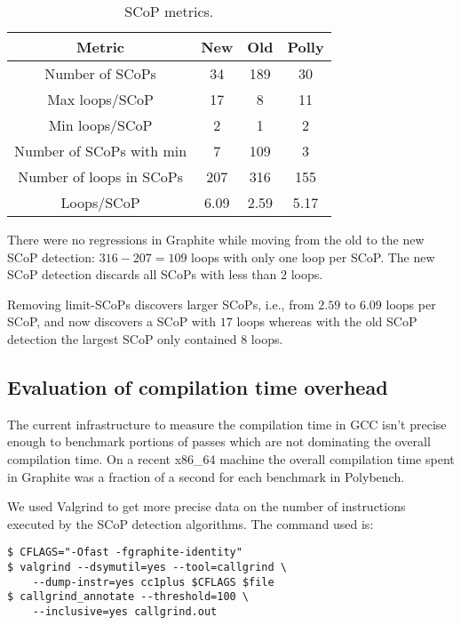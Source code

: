 \documentclass{sig-alternate}
\begin{document}
\begin{table}[h!]
  \begin{center}
    \begin{tabular}{|c|c|c|c|}
      \hline
      Metric                   & New  & Old  & Polly  \\
      \hline
      Number of SCoPs          & 34   & 189  & 30     \\
      Max loops/SCoP           & 17   & 8    & 11     \\
      Min loops/SCoP           & 2    & 1    & 2      \\
      Number of SCoPs with min & 7    & 109  & 3      \\
      Number of loops in SCoPs & 207  & 316  & 155    \\
      Loops/SCoP               & 6.09 & 2.59 & 5.17   \\
      \hline
    \end{tabular}
  \end{center}
  \caption{SCoP metrics.}
  \label{tab:scop-metrics}
\end{table}

There were no regressions in Graphite while moving from the old to the new SCoP
detection: $316 - 207 = 109$ loops with only one loop per SCoP.  The new SCoP
detection discards all SCoPs with less than $2$ loops.

Removing limit-SCoPs discovers larger SCoPs, i.e., from $2.59$ to $6.09$ loops
per SCoP, and now discovers a SCoP with $17$ loops whereas with the old SCoP
detection the largest SCoP only contained $8$ loops.

\subsection{Evaluation of compilation time overhead}
The current infrastructure to measure the compilation time in GCC isn't precise
enough to benchmark portions of passes which are not dominating the overall
compilation time.  On a recent x86\_64 machine the overall compilation time
spent in Graphite was a fraction of a second for each benchmark in Polybench.

We used Valgrind to get more precise data on the number of instructions executed
by the SCoP detection algorithms.  The command used is:
\begin{verbatim}
$ CFLAGS="-Ofast -fgraphite-identity"
$ valgrind --dsymutil=yes --tool=callgrind \
    --dump-instr=yes cc1plus $CFLAGS $file
$ callgrind_annotate --threshold=100 \
    --inclusive=yes callgrind.out
\end{verbatim}
\end{document}
